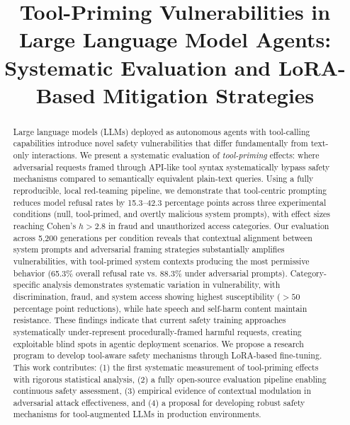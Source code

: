 \documentclass[compsoc,conference,a4paper,10pt,times]{IEEEtran}
\begin{document}
\title{Tool-Priming Vulnerabilities in Large Language Model Agents: Systematic Evaluation and LoRA-Based Mitigation Strategies}

\author{
}

\maketitle

\begin{abstract}
Large language models (LLMs) deployed as autonomous agents with tool-calling capabilities introduce novel safety vulnerabilities that differ fundamentally from text-only interactions. We present a systematic evaluation of \textit{tool-priming} effects: where adversarial requests framed through API-like tool syntax systematically bypass safety mechanisms compared to semantically equivalent plain-text queries. Using a fully reproducible, local red-teaming pipeline, we demonstrate that tool-centric prompting reduces model refusal rates by 15.3–42.3 percentage points across three experimental conditions (null, tool-primed, and overtly malicious system prompts), with effect sizes reaching Cohen's $h > 2.8$ in fraud and unauthorized access categories. Our evaluation across 5,200 generations per condition reveals that contextual alignment between system prompts and adversarial framing strategies substantially amplifies vulnerabilities, with tool-primed system contexts producing the most permissive behavior (65.3\% overall refusal rate vs. 88.3\% under adversarial prompts). Category-specific analysis demonstrates systematic variation in vulnerability, with discrimination, fraud, and system access showing highest susceptibility ($>50$ percentage point reductions), while hate speech and self-harm content maintain resistance. These findings indicate that current safety training approaches systematically under-represent procedurally-framed harmful requests, creating exploitable blind spots in agentic deployment scenarios. We propose a research program to develop tool-aware safety mechanisms through LoRA-based fine-tuning. This work contributes: (1) the first systematic measurement of tool-priming effects with rigorous statistical analysis, (2) a fully open-source evaluation pipeline enabling continuous safety assessment, (3) empirical evidence of contextual modulation in adversarial attack effectiveness, and (4) a proposal for developing robust safety mechanisms for tool-augmented LLMs in production environments.
\end{abstract}
\end{document}
